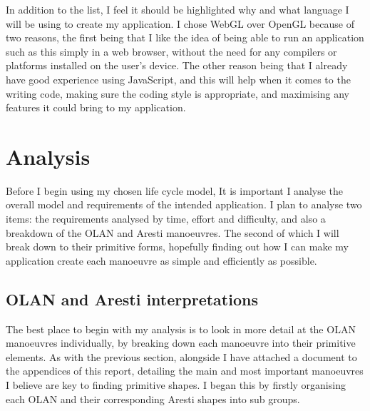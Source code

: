 In addition to the list, I feel it should be highlighted why and what language I will be using to create my application. I chose WebGL over OpenGL because of two reasons, the first being that I like the idea of being able to run an application such as this simply in a web browser, without the need for any compilers or platforms installed on the user's device. The other reason being that I already have good experience using JavaScript, and this will help when it comes to the writing code, making sure the coding style is appropriate, and maximising any features it could bring to my application.

\section{Analysis}
Before I begin using my chosen life cycle model, It is important I analyse the overall model and requirements of the intended application. I plan to analyse two items: the requirements analysed by time, effort and difficulty, and also a breakdown of the OLAN and Aresti manoeuvres. The second of which I will break down to their primitive forms, hopefully finding out how I can make my application create each manoeuvre as simple and efficiently as possible.

\subsection{OLAN and Aresti interpretations}
The best place to begin with my analysis is to look in more detail at the OLAN manoeuvres individually, by breaking down each manoeuvre into their primitive elements. As with the previous section, alongside I have attached a document to the appendices of this report, detailing the main and most important manoeuvres I believe are key to finding primitive shapes. I began this by firstly organising each OLAN and their corresponding Aresti shapes into sub groups. 

